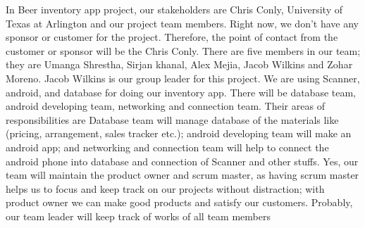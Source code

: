 In Beer inventory app project, our stakeholders are Chris Conly, University of Texas at Arlington and our project team members. Right now, we don’t have any sponsor or customer for the project. Therefore, the point of contact from the customer or sponsor will be the Chris Conly. There are five members in our team; they are Umanga Shrestha, Sirjan khanal, Alex Mejia, Jacob Wilkins and Zohar Moreno. Jacob Wilkins is our group leader for this project. We are using Scanner, android, and database for doing our inventory app. There will be database team, android developing team, networking and connection team. Their areas of responsibilities are Database team will manage database of the materials like (pricing, arrangement, sales tracker etc.); android developing team will make an android app; and networking and connection team will help to connect the android phone into database and connection of Scanner and other stuffs. Yes, our team will maintain the product owner and scrum master, as having scrum master helps us to focus and keep track on our projects without distraction; with product owner we can make good products and satisfy our customers. Probably, our team leader will keep track of works of all team members
